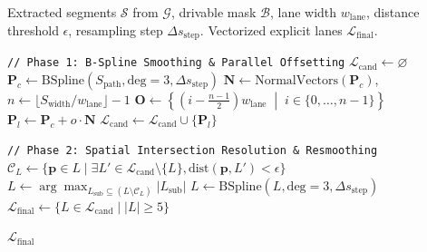\begin{algorithm}[t]
\caption{Lane Topology Extraction}
\label{alg:lane_topology}
\begin{algorithmic}[1]

\Require Extracted segments $\mathcal{S}$ from $\mathcal{G}$, drivable mask $\mathcal{B}$, lane width $w_{\text{lane}}$, distance threshold $\epsilon$, resampling step $\Delta s_{\text{step}}$.
\Ensure Vectorized explicit lanes $\mathcal{L}_{\text{final}}$.

\State \texttt{// Phase 1: B-Spline Smoothing \& Parallel Offsetting}
\State $\mathcal{L}_{\text{cand}} \gets \varnothing$
    \State $\mathbf{P}_c \gets \text{BSpline}(S_{\text{path}}, \text{deg} = 3, \Delta s_{\text{step}})$
    \State $\mathbf{N} \gets \text{NormalVectors}(\mathbf{P}_c)$, $n \gets \lfloor S_{\text{width}} / w_{\text{lane}} \rfloor - 1$
    \State $\mathbf{O} \gets \left\{ \left(i - \frac{n-1}{2}\right) w_{\text{lane}} \;\middle|\; i \in \{0, \dots, n-1\} \right\}$
        \State $\mathbf{P}_l \gets \mathbf{P}_c + o \cdot \mathbf{N}$ 
         
            \State $\mathcal{L}_{\text{cand}} \gets \mathcal{L}_{\text{cand}} \cup \{\mathbf{P}_l\}$
        \EndIf
    \EndFor
\EndFor

\State \texttt{// Phase 2: Spatial Intersection Resolution \& Resmoothing}
    \State $\mathcal{C}_L \gets \{ \mathbf{p} \in L \mid \exists L' \in \mathcal{L}_{\text{cand}} \setminus \{L\}, \text{dist}(\mathbf{p}, L') < \epsilon \}$ 
    \State $L \gets \arg\max_{L_{\text{sub}} \subseteq (L \setminus \mathcal{C}_L)} |L_{\text{sub}}|$ 
    \State $L \gets \text{BSpline}(L, \text{deg} = 3, \Delta s_{\text{step}})$ 
\EndFor
\State $\mathcal{L}_{\text{final}} \gets \{ L \in \mathcal{L}_{\text{cand}} \mid |L| \ge 5 \}$ 

\State \Return $\mathcal{L}_{\text{final}}$

\end{algorithmic}
\end{algorithm}



